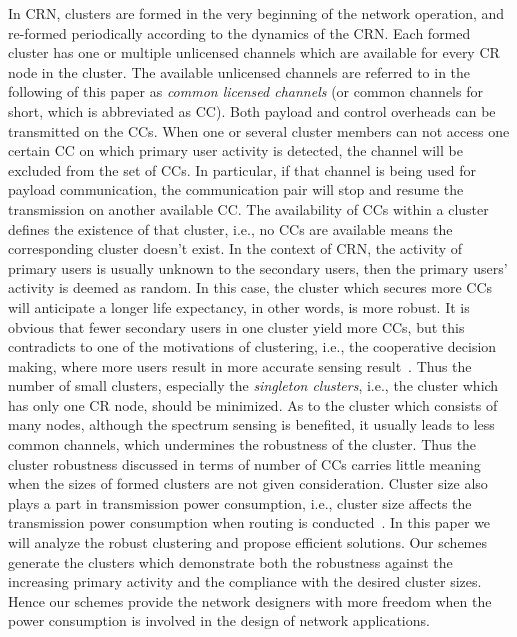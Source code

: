 \documentclass[times]{ettauth}
\newcommand{\ie}{i.e., }
\theoremstyle{mytheoremstyle}
\theoremstyle{mytheoremstyle}
\theoremstyle{mytheoremstyle}
\begin{document}
In CRN, clusters are formed in the very beginning of the network operation, and re-formed periodically according to the dynamics of the CRN.
Each formed cluster has one or multiple unlicensed channels which are available for every CR node in the cluster.
The available unlicensed channels are referred to in the following of this paper as \textit{common licensed channels} (or common channels for short, which is abbreviated as CC).
Both payload and control overheads can be transmitted on the CCs.
When one or several cluster members can not access one certain CC on which primary user activity is detected, the channel will be excluded from the set of CCs.
In particular, if that channel is being used for payload communication, the communication pair will stop and resume the transmission on another available CC.
The availability of CCs within a cluster defines the existence of that cluster, \ie no CCs are available means the corresponding cluster doesn't exist.
In the context of CRN, the activity of primary users is usually unknown to the secondary users, then the primary users' activity is deemed as random.
In this case, the cluster which secures more CCs will anticipate a longer life expectancy, in other words, is more robust.
It is obvious that fewer secondary users in one cluster yield more CCs, but this contradicts to one of the motivations of clustering, \ie the cooperative decision making, where more users result in more accurate sensing result~\cite{Consensus_based_clustering12}.
Thus the number of small clusters, especially the \textit{singleton clusters}, \ie the cluster which has only one CR node, should be minimized.
As to the cluster which consists of many nodes, although the spectrum sensing is benefited, it usually leads to less common channels, which undermines the robustness of the cluster.
Thus the cluster robustness discussed in terms of number of CCs carries little meaning when the sizes of formed clusters are not given consideration.
Cluster size also plays a part in transmission power consumption, \ie cluster size affects the transmission power consumption when routing is conducted~\cite{clustering_globecom11, EnergyEfficientClusteringRouting_2015}.
In this paper we will analyze the robust clustering and propose efficient solutions.
Our schemes generate the clusters which demonstrate both the robustness against the increasing primary activity and the compliance with the desired cluster sizes.
Hence our schemes provide the network designers with more freedom when the power consumption is involved in the design of network applications.
\end{document}

